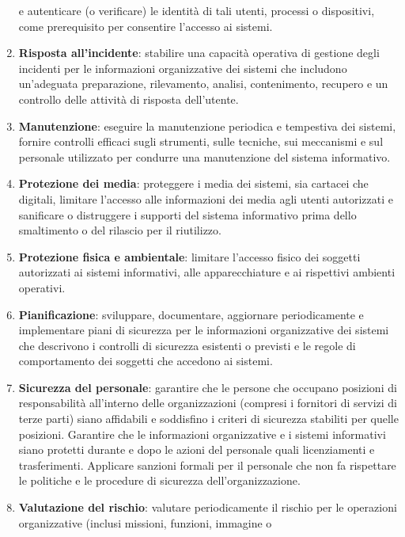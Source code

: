 \begin{enumerate}
          e autenticare (o verificare) le identità di tali utenti, processi o
          dispositivi, come prerequisito per consentire l'accesso ai sistemi.
    \item \textbf{Risposta all'incidente}: stabilire una capacità operativa
          di gestione degli incidenti per le informazioni organizzative dei sistemi
          che includono un'adeguata preparazione, rilevamento, analisi, contenimento,
          recupero e un controllo delle attività di risposta dell'utente.
    \item \textbf{Manutenzione}: eseguire la manutenzione periodica e
          tempestiva dei sistemi, fornire controlli efficaci sugli strumenti,
          sulle tecniche, sui meccanismi e sul personale utilizzato per condurre
          una manutenzione del sistema informativo.
    \item \textbf{Protezione dei media}: proteggere i media dei sistemi, sia
          cartacei che digitali, limitare l'accesso alle informazioni dei media agli
          utenti autorizzati e sanificare o distruggere i supporti del sistema
          informativo prima dello smaltimento o del rilascio per il riutilizzo.
    \item \textbf{Protezione fisica e ambientale}: limitare l'accesso fisico
          dei soggetti autorizzati ai sistemi informativi, alle apparecchiature e ai
          rispettivi ambienti operativi.
    \item \textbf{Pianificazione}: sviluppare, documentare, aggiornare
          periodicamente e implementare piani di sicurezza per le informazioni
          organizzative dei sistemi che descrivono i controlli di sicurezza esistenti
          o previsti e le regole di comportamento dei soggetti che accedono ai sistemi.
    \item \textbf{Sicurezza del personale}: garantire che le persone che occupano
          posizioni di responsabilità all'interno delle organizzazioni
          (compresi i fornitori di servizi di terze parti) siano affidabili e
          soddisfino i criteri di sicurezza stabiliti per quelle posizioni.
          Garantire che le informazioni organizzative e i sistemi informativi siano
          protetti durante e dopo le azioni del personale quali licenziamenti e
          trasferimenti. Applicare sanzioni formali per il personale che non fa
          rispettare le politiche e le procedure di sicurezza dell'organizzazione.
    \item \textbf{Valutazione del rischio}: valutare periodicamente il rischio
          per le operazioni organizzative (inclusi missioni, funzioni, immagine o

\end{enumerate}
